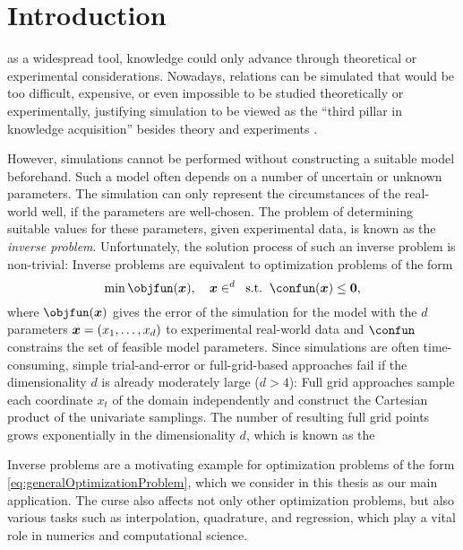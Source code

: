 
\chapter{Introduction}
\label{chap:10introduction}

as a widespread tool,
knowledge could only advance through theoretical or
experimental considerations.
Nowadays, relations can be simulated
that would be too difficult, expensive, or even impossible
to be studied theoretically or experimentally,
justifying simulation to be viewed as the
``third pillar in knowledge acquisition''
besides theory and experiments \cite{Bungartz14Modeling}.

However, simulations cannot be performed without constructing
a suitable model beforehand.
Such a model often depends on a number of uncertain or unknown parameters.
The simulation can only represent the circumstances of the real-world
well, if the parameters are well-chosen.
The problem of determining suitable values for these parameters,
given experimental data, is known as the \emph{inverse problem}.
Unfortunately, the solution process of such an inverse problem is non-trivial:
Inverse problems are equivalent to optimization problems of the form
\begin{equation}
  \label{eq:generalOptimizationProblem}
  \min \objfun(\*x),\quad
  \*x \in \real^d\;\;\text{s.t.}\;\;
  \confun(\*x) \le \*0,
\end{equation}
where $\objfun(\*x)$ gives the error of the simulation for the model with
the $d$ parameters ${\boldsymbol{x}} = (x_1, \dotsc, x_d)$
to experimental real-world data and
$\confun$ constrains the set of feasible model parameters.
Since simulations are often time-consuming,
simple trial-and-error or full-grid-based approaches fail
if the dimensionality $d$ is already moderately large ($d > 4$):
Full grid approaches sample each coordinate $x_t$ of the domain
independently and construct the Cartesian product of the univariate
samplings.
The number of resulting full grid points
grows exponentially in the dimensionality $d$,
which is known as the 

Inverse problems are a motivating example for optimization problems
of the form \eqref{eq:generalOptimizationProblem}, which we consider in
this thesis as our main application.
The curse also affects not only other optimization problems,
but also various tasks such as interpolation, quadrature, and regression,
which play a vital role in numerics and computational science.

